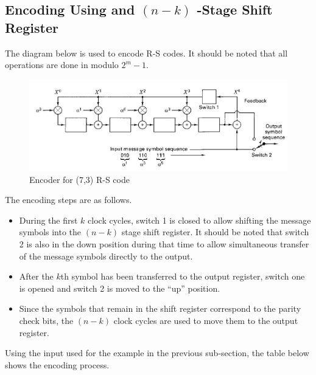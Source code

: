 \documentclass[fontsize=12pt]{article}
\begin{document}
\subsection{Encoding Using and $(n-k)$ -Stage Shift Register}
The diagram below is used to encode R-S codes. It should be noted that all operations are done in modulo $2^m-1$.
\begin{figure}
  \includegraphics[width=\linewidth]{RS_encoder.jpg}
  \caption{Encoder for (7,3) R-S code }
  \label{fig1}
\end{figure}
The encoding steps are as follows. 
\begin{itemize}
\item During the first $k$ clock cycles, switch 1 is closed to allow shifting the message symbols into the $(n-k)$ stage shift register. It should be noted that switch 2 is also in the down position during that time to allow simultaneous transfer of the message symbols directly to the output.

\item After the $k$th symbol has been transferred to the output register, switch one is opened and switch 2 is moved to the ``up'' position.

\item Since the symbols that remain in the shift register correspond to the parity check bits, the $(n-k)$ clock cycles are used to move them to the output register.

\end{itemize}
Using the input used for the example in the previous sub-section, the table below shows the encoding process.
\end{document}
